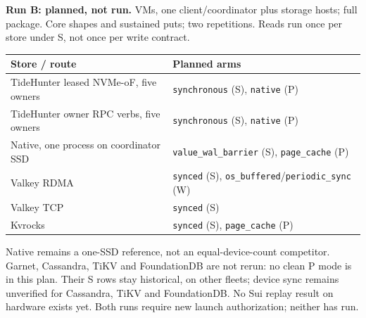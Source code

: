 \textbf{Run B: planned, not run.}  VMs,
one client/coordinator plus  storage hosts;
full package. Core shapes and sustained puts; two repetitions. Reads run once
per store under S, not once per write contract.
\begin{center}
\begin{tabular}{L{.48\linewidth}L{.42\linewidth}}\toprule
Store / route & Planned arms\\\midrule
TideHunter leased NVMe-oF, five owners & \texttt{synchronous} (S), \texttt{native} (P)\\
TideHunter owner RPC verbs, five owners & \texttt{synchronous} (S), \texttt{native} (P)\\
Native, one process on coordinator SSD & \texttt{value\_wal\_barrier} (S), \texttt{page\_cache} (P)\\
Valkey RDMA & \texttt{synced} (S), \texttt{os\_buffered}/\texttt{periodic\_sync} (W)\\
Valkey TCP & \texttt{synced} (S)\\
Kvrocks & \texttt{synced} (S), \texttt{page\_cache} (P)\\\bottomrule
\end{tabular}
\end{center}
Native remains a one-SSD reference, not an equal-device-count competitor.
Garnet, Cassandra, TiKV and FoundationDB are not rerun: no clean P mode is in
this plan. Their S rows stay historical, on other fleets; device sync remains
unverified for Cassandra, TiKV and FoundationDB. No Sui replay result on hardware
exists yet. Both runs require new launch authorization; neither has run.
\endgroup
